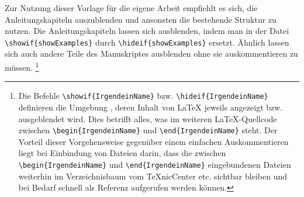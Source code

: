 \begin{showExamples}
Zur Nutzung dieser Vorlage für die eigene Arbeit empfiehlt es sich, die Anleitungskapiteln auszublenden und ansonsten die bestehende Struktur zu nutzen.
Die Anleitungskapiteln lassen sich ausblenden, indem man in der Datei
\verb+\showif{showExamples}+ durch \verb+\hideif{showExamples}+ ersetzt.
Ähnlich lassen sich auch andere Teile des Manuskriptes ausblenden ohne sie auskommentieren zu müssen.%
%
\footnote{Die Befehle \verb+\showif{IrgendeinName}+ bzw. \verb+\hideif{IrgendeinName}+ definieren die Umgebung ,
deren Inhalt von LaTeX{} jeweils angezeigt bzw. ausgeblendet wird.
Dies betrifft alles, was im weiteren \LaTeX-Quellcode zwischen \verb+\begin{IrgendeinName}+ und \verb+\end{IrgendeinName}+ steht.
Der Vorteil dieser Vorgehensweise gegenüber einem einfachen Auskommentieren liegt bei Einbindung von Dateien darin,
dass die zwischen \verb+\begin{IrgendeinName}+ und \verb+\end{IrgendeinName}+ eingebundenen Dateien
weiterhin im Verzeichnisbaum vom TeXnicCenter etc. sichtbar bleiben und bei Bedarf schnell als Referenz aufgerufen werden können.}
%














%
%
%
%
%
%
%
%
%
\end{showExamples}%